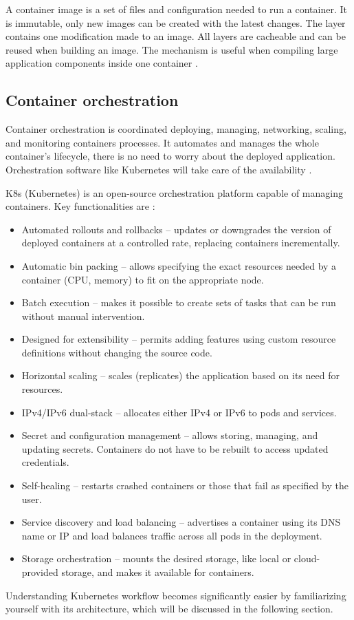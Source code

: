 A container image is a set of files and configuration needed to run a container. It is immutable, only new images can be created with the latest changes. The layer contains one modification made to an image. All layers are cacheable and can be reused when building an image. The mechanism is useful when compiling large application components inside one container \cite{DockerDocs}. 


\subsection{Container orchestration}
\label{sec:ContainerOrchestration}

Container orchestration is coordinated deploying, managing, networking, scaling, and monitoring containers processes. It automates and manages the whole container's lifecycle, there is no need to worry about the deployed application. Orchestration software like Kubernetes will take care of the availability \cite{RedhatContainerization}.

K8s (Kubernetes) is an open-source orchestration platform capable of managing containers. Key functionalities are \cite{KubernetesDocs}:

\begin{itemize}
    \item Automated rollouts and rollbacks -- updates or downgrades the version of deployed containers at a controlled rate, replacing containers incrementally.
    \item Automatic bin packing -- allows specifying the exact resources needed by a container (CPU, memory) to fit on the appropriate node.
    \item Batch execution -- makes it possible to create sets of tasks that can be run without manual intervention.
    \item Designed for extensibility -- permits adding features using custom resource definitions without changing the source code.
    \item Horizontal scaling -- scales (replicates) the application based on its need for resources.
    \item IPv4/IPv6 dual-stack -- allocates either IPv4 or IPv6 to pods and services.
    \item Secret and configuration management -- allows storing, managing, and updating secrets. Containers do not have to be rebuilt to access updated credentials.
    \item Self-healing -- restarts crashed containers or those that fail as specified by the user.
    \item Service discovery and load balancing -- advertises a container using its DNS name or IP and load balances traffic across all pods in the deployment.
    \item Storage orchestration -- mounts the desired storage, like local or cloud-provided storage, and makes it available for containers.
\end{itemize}
Understanding Kubernetes workflow becomes significantly easier by familiarizing yourself with its architecture, which will be discussed in the following section.


